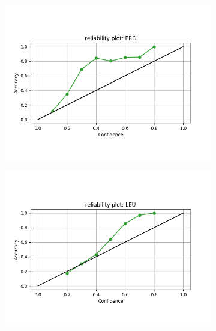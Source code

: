 \begin{figure}[!ht]
\begin{minipage}[b]{0.45\linewidth}
\begin{subfigure}[b]{\linewidth}
	\includegraphics[width=1.27\textwidth]{pics/rel_PRO_29_RR}
\end{subfigure}
\begin{subfigure}[b]{\linewidth}
	\includegraphics[width=1.27\textwidth]{pics/rel_LEU_29_RR}
\end{subfigure}


\end{minipage}
\end{figure}
